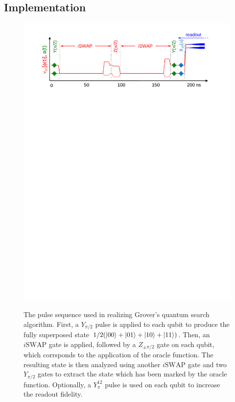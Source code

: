 \subsection{Implementation}

\begin{figure}
	\centering
		\includegraphics[width=1.\textwidth]{./material/papers/grover/figures/grover_algorithm_pulse_sequence}
	\label{fig:Grover3}
	\caption{The pulse sequence used in realizing Grover's quantum search algorithm. First, a $Y_{\pi/2}$ pulse is applied to each qubit to produce the fully superposed state $1/2(\left| 00 \right>+\left| 01 \right>+\left| 10 \right>+\left| 11 \right>)$. Then, an $i\mathrm{SWAP}$ gate is applied, followed by a $Z_{\pm \pi /2}$ gate on each qubit, which corrsponds to the application of the oracle function. The resulting state is then analyzed using another $i\mathrm{SWAP}$ gate and two $Y_{\pi/2}$ gates to extract the state which has been marked by the oracle function. Optionally, a $Y^{12}_{\pi}$ pulse is used on each qubit to increase the readout fidelity.}
\end{figure}



